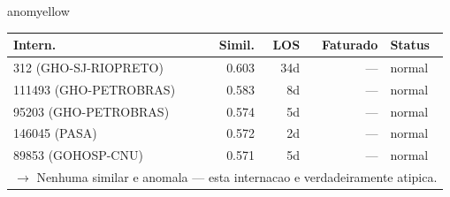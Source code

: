 \documentclass[a4paper,10pt]{article}
\begin{document}
\begin{anomalycard}[Internacao 2 | GHO-POSTAL | MODERADO (z=2.28)]{anomyellow}
\begin{tabular}{l r r r l}\toprule\textbf{Intern.} & \textbf{Simil.} & \textbf{LOS} & \textbf{Faturado} & \textbf{Status} \\\midrule
312 (GHO-SJ-RIOPRETO) & 0.603 & 34d & --- & \textcolor{jcubeblue}{normal} \\
111493 (GHO-PETROBRAS) & 0.583 & 8d & --- & \textcolor{jcubeblue}{normal} \\
95203 (GHO-PETROBRAS) & 0.574 & 5d & --- & \textcolor{jcubeblue}{normal} \\
146045 (PASA) & 0.572 & 2d & --- & \textcolor{jcubeblue}{normal} \\
89853 (GOHOSP-CNU) & 0.571 & 5d & --- & \textcolor{jcubeblue}{normal} \\
\multicolumn{5}{l}{\textcolor{jcubeblue}{\small $\rightarrow$ Nenhuma similar e anomala --- esta internacao e verdadeiramente atipica.}} \\
\bottomrule\end{tabular}


\end{anomalycard}

\newpage
\end{document}
